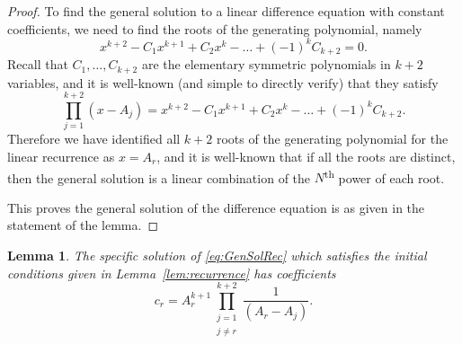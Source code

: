 \documentclass[12pt,a4paper,reqno]{amsart}
\newtheorem{lemma}{Lemma}
\theoremstyle{remark}
\numberwithin{equation}{section}
\begin{document}
\begin{proof}
    To find the general solution to a linear difference equation with constant coefficients, we need to find the roots of the generating polynomial, namely
    \[
    x^{k+2} - C_1 x^{k+1} + C_2 x^{k} - \dots + (-1)^{k} C_{k+2} = 0.
    \]
Recall that $C_1, \dots, C_{k+2}$ are the elementary symmetric polynomials in $k+2$ variables, and it is well-known (and simple to directly verify) that they satisfy
\[
\prod_{j=1}^{k+2} \left(x - A_j\right) = x^{k+2} - C_1 x^{k+1} + C_2 x^{k} - \dots + (-1)^{k} C_{k+2}.
\]
Therefore we have identified all $k+2$ roots of the generating polynomial for the linear recurrence as $x=A_r$, and it is well-known that if all the roots are distinct, then the general solution is a linear combination of the $N$\textsuperscript{th} power of each root.

This proves the general solution of the difference equation is as given in the statement of the lemma.
\end{proof}

\begin{lemma}\label{lem:RecurrenceSpecificSolution}
The specific solution of \eqref{eq:GenSolRec} which satisfies the initial conditions given in Lemma~\ref{lem:recurrence} has coefficients
\[
c_r =  A_r^{k+1} \prod_{\substack{j=1 \\ j \neq r}}^{k+2} \frac{1}{(A_r - A_j)}.
\]
\end{lemma}
\end{document}
